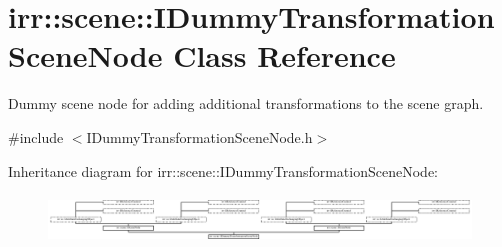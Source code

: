\hypertarget{classirr_1_1scene_1_1IDummyTransformationSceneNode}{}\section{irr\+:\+:scene\+:\+:I\+Dummy\+Transformation\+Scene\+Node Class Reference}
\label{classirr_1_1scene_1_1IDummyTransformationSceneNode}


Dummy scene node for adding additional transformations to the scene graph.  




{\ttfamily \#include $<$I\+Dummy\+Transformation\+Scene\+Node.\+h$>$}

Inheritance diagram for irr\+:\+:scene\+:\+:I\+Dummy\+Transformation\+Scene\+Node\+:\begin{figure}[H]
\begin{center}
\leavevmode
\includegraphics[height=1.282051cm]{classirr_1_1scene_1_1IDummyTransformationSceneNode}
\end{center}
\end{figure}
